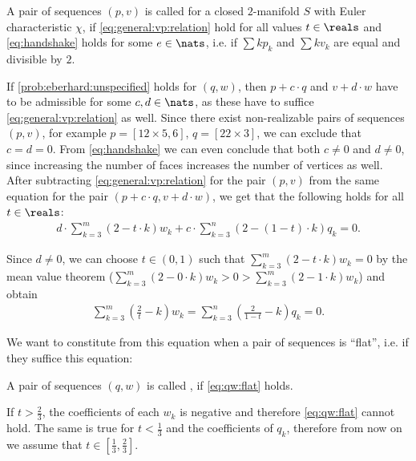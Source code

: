 \begin{definition} A pair of sequences $(p, v)$ is called  for a closed $2$-manifold $S$ with {\sc Euler} characteristic $\chi$, if \eqref{eq:general:vp:relation} hold for all values $t \in \reals$ and \eqref{eq:handshake} holds for some $e \in \nats$, i.e. if $\sum k p_k$ and $\sum k v_k$ are equal and divisible by $2$.
\end{definition}

If \autoref{prob:eberhard:unspecified} holds for $(q, w)$, then $p + c \cdot q$ and $v + d \cdot w$ have to be admissible for some $c,d \in \nats$, as these have to suffice \eqref{eq:general:vp:relation} as well. Since there exist non-realizable pairs of sequences $(p, v)$, for example $p = [12 \times 5, 6]$, $q = [22 \times 3]$, we can exclude that $c = d = 0$. From \eqref{eq:handshake} we can even conclude that both $c \neq 0$ and $d \neq 0$, since increasing the number of faces increases the number of vertices as well. After subtracting \eqref{eq:general:vp:relation} for the pair $(p, v)$ from the same equation for the pair $(p + c \cdot q, v + d \cdot w)$, we get that the following holds for all $t \in \reals$:
\begin{align*}
  d \cdot \sum_{k=3}^m \left(2 - t \cdot k \right) w_k + c \cdot \sum_{k=3}^n \left( 2 - (1 - t) \cdot k \right) q_k = 0. 
\end{align*}

Since $d \neq 0$, we can choose $t \in (0, 1)$ such that $\sum_{k=3}^m (2 - t \cdot k) w_k = 0$ by the mean value theorem ($\sum_{k=3}^m (2 - 0 \cdot k) w_k > 0 > \sum_{k=3}^m (2 - 1 \cdot k) w_k$) and obtain
\begin{align}
    \sum_{k=3}^m \left(\frac{2}{t} - k \right) w_k = \sum_{k=3}^n \left( \frac{2}{1-t} - k \right) q_k = 0. \label{eq:qw:flat}
\end{align}

We want to constitute from this equation when a pair of sequences is ``flat'', i.e. if they suffice this equation:

\begin{definition}
  A pair of sequences $(q, w)$ is called , if \eqref{eq:qw:flat} holds.
\end{definition}

If $t > \frac{2}{3}$, the coefficients of each $w_k$ is negative and therefore \eqref{eq:qw:flat} cannot hold. The same is true for $t < \frac{1}{3}$ and the coefficients of $q_k$, therefore from now on we assume that $t \in \left[\frac{1}{3}, \frac{2}{3}\right]$.

